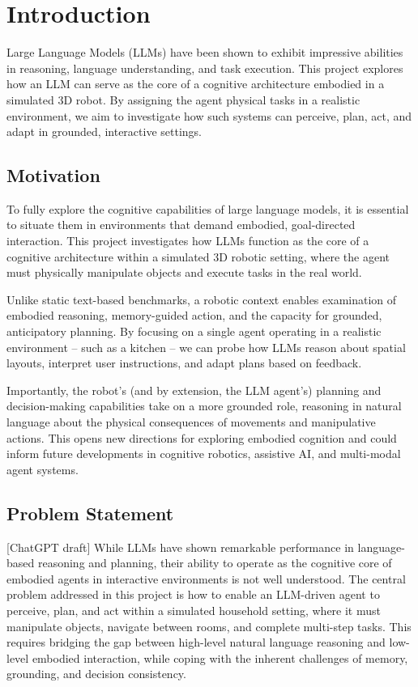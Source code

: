 \documentclass[../report.tex]{subfiles}
\begin{document}
\section{Introduction}
\label{sec:introduction}

Large Language Models (LLMs) have been shown to exhibit impressive abilities in reasoning, language understanding, and task execution. This project explores how an LLM can serve as the core of a cognitive architecture embodied in a simulated 3D robot. By assigning the agent physical tasks in a realistic environment, we aim to investigate how such systems can perceive, plan, act, and adapt in grounded, interactive settings.

\subsection{Motivation}
\label{sec:introduction:motivation}

To fully explore the cognitive capabilities of large language models, it is essential to situate them in environments that demand embodied, goal-directed interaction. This project investigates how LLMs function as the core of a cognitive architecture within a simulated 3D robotic setting, where the agent must physically manipulate objects and execute tasks in the real world.

Unlike static text-based benchmarks, a robotic context enables examination of embodied reasoning, memory-guided action, and the capacity for grounded, anticipatory planning. By focusing on a single agent operating in a realistic environment -- such as a kitchen -- we can probe how LLMs reason about spatial layouts, interpret user instructions, and adapt plans based on feedback.

Importantly, the robot's (and by extension, the LLM agent's) planning and decision-making capabilities take on a more grounded role, reasoning in natural language about the physical consequences of movements and manipulative actions. This opens new directions for exploring embodied cognition and could inform future developments in cognitive robotics, assistive AI, and multi-modal agent systems.

\subsection{Problem Statement}
\label{sec:introduction:problem_statement}

[ChatGPT draft]
While LLMs have shown remarkable performance in language-based reasoning and planning, their ability to operate as the cognitive core of embodied agents in interactive environments is not well understood. The central problem addressed in this project is how to enable an LLM-driven agent to perceive, plan, and act within a simulated household setting, where it must manipulate objects, navigate between rooms, and complete multi-step tasks. This requires bridging the gap between high-level natural language reasoning and low-level embodied interaction, while coping with the inherent challenges of memory, grounding, and decision consistency.
\end{document}
